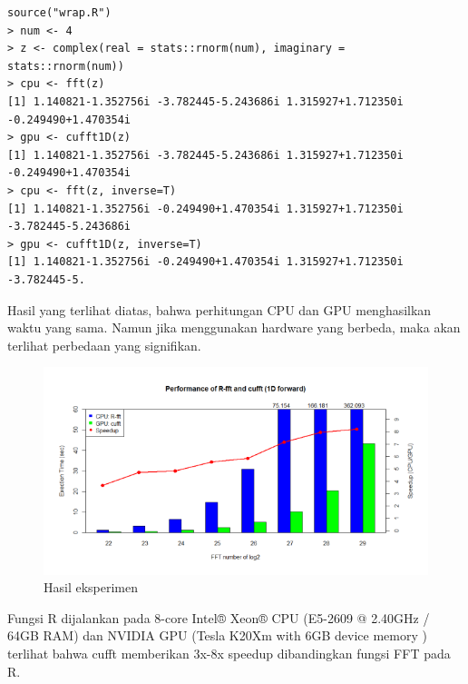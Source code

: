 \begin{lstlisting}
source("wrap.R")
> num <- 4
> z <- complex(real = stats::rnorm(num), imaginary = stats::rnorm(num))
> cpu <- fft(z)
[1] 1.140821-1.352756i -3.782445-5.243686i 1.315927+1.712350i -0.249490+1.470354i
> gpu <- cufft1D(z)
[1] 1.140821-1.352756i -3.782445-5.243686i 1.315927+1.712350i -0.249490+1.470354i
> cpu <- fft(z, inverse=T)
[1] 1.140821-1.352756i -0.249490+1.470354i 1.315927+1.712350i -3.782445-5.243686i
> gpu <- cufft1D(z, inverse=T)
[1] 1.140821-1.352756i -0.249490+1.470354i 1.315927+1.712350i -3.782445-5.
\end{lstlisting}

Hasil yang terlihat diatas, bahwa perhitungan CPU dan GPU menghasilkan waktu yang sama. Namun jika menggunakan hardware yang berbeda, maka akan terlihat perbedaan yang signifikan.

\begin{figure}
\centering
\includegraphics[width=0.7\linewidth]{./pics/hasileksperimen}
\caption{Hasil eksperimen}
\label{fig:hasileksperimen}
\end{figure}

Fungsi R dijalankan pada 8-core Intel® Xeon® CPU (E5-2609 @ 2.40GHz / 64GB RAM) dan NVIDIA GPU (Tesla K20Xm with 6GB device memory ) terlihat bahwa cufft memberikan 3x-8x speedup dibandingkan fungsi FFT pada R.